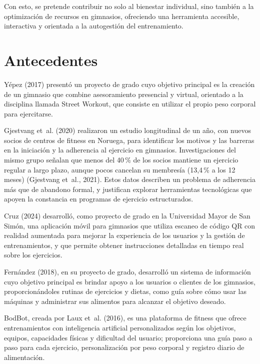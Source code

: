 Con esto, se pretende contribuir no solo al bienestar individual, sino también
a la optimización de recursos en gimnasios, ofreciendo una herramienta
accesible, interactiva y orientada a la autogestión del entrenamiento.

\section{Antecedentes}
\label{sec:antecedentes}

Yépez (2017) presentó un proyecto de grado cuyo objetivo principal es la
creación de un gimnasio que combine asesoramiento presencial y virtual,
orientado a la disciplina llamada Street Workout, que consiste en utilizar el
propio peso corporal para ejercitarse.

Gjestvang et~al. (2020) realizaron un estudio longitudinal de un año, con
nuevos socios de centros de fitness en Noruega, para identificar los motivos y
las barreras en la iniciación y la adherencia al ejercicio en gimnasios.
Investigaciones del mismo grupo señalan que menos del 40\,\% de los socios
mantiene un ejercicio regular a largo plazo, aunque pocos cancelan su
membresía (13,4\,\% a los 12 meses) (Gjestvang et~al., 2021). Estos datos
describen un problema de adherencia más que de abandono formal, y justifican
explorar herramientas tecnológicas que apoyen la constancia en programas de
ejercicio estructurados.

Cruz (2024) desarrolló, como proyecto de grado en la Universidad Mayor de San
Simón, una aplicación móvil para gimnasios que utiliza escaneo de código QR con
realidad aumentada para mejorar la experiencia de los usuarios y la gestión de
entrenamientos, y que permite obtener instrucciones detalladas en tiempo real
sobre los ejercicios.

Fernández (2018), en su proyecto de grado, desarrolló un sistema de información
cuyo objetivo principal es brindar apoyo a los usuarios o clientes de los
gimnasios, proporcionándoles rutinas de ejercicios y dietas, como guía sobre
cómo usar las máquinas y administrar sus alimentos para alcanzar el objetivo
deseado.

BodBot, creada por Laux et~al. (2016), es una plataforma de fitness que ofrece
entrenamientos con inteligencia artificial personalizados según los objetivos,
equipos, capacidades físicas y dificultad del usuario; proporciona una guía paso
a paso para cada ejercicio, personalización por peso corporal y registro diario
de alimentación.

